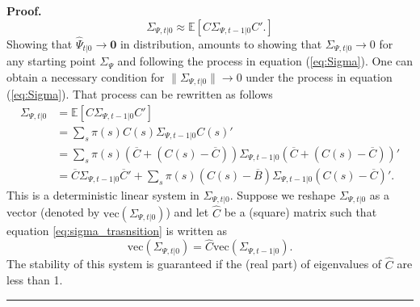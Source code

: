 \documentclass[thmsb,11pt]{article}
\newenvironment{proof}[1][Proof]{\noindent \textbf{#1.} }{\  \rule{0.5em}{0.5em}}
\begin{document}
\begin{proof}
	\begin{equation}
		\Sigma_{\Psi,t|0} \approx \mathbb{E}[C \Sigma_{\Psi,t-1|0} C'.] \label{eq:Sigma}
	\end{equation}  Showing that $\hat{\Psi}_{t|0} \rightarrow \bm 0$ in distribution, amounts to showing that $\Sigma_{\Psi,t|0}\rightarrow 0$ for any starting point $\Sigma_{\Psi}$ and following the process in equation (\ref{eq:Sigma}).  One can obtain a necessary condition for $\|\Sigma_{\Psi,t|0}\|\rightarrow 0$ under the process in equation (\ref{eq:Sigma}).
	That process can be rewritten as follows
	\begin{align}
		\Sigma_{\Psi,t|0} &= \mathbb{E}[C \Sigma_{\Psi,t-1|0} C']\\
				    &=\sum_s \pi(s) C(s) \Sigma_{\Psi,t-1|0} C(s)'\\
				   &=\sum_s \pi(s) (\overline C+(C(s)-\overline C))\Sigma_{\Psi,t-1|0}(\overline C+(C(s)-\overline C))'\\
				  &=\overline C \Sigma_{\Psi,t-1|0}\overline C' +\sum_s\pi(s) (C(s)-\overline B)\Sigma_{\Psi,t-1|0}(C(s)-\overline C)'.\label{eq:sigma_trasnsition}
	\end{align}
% 	
 	This is a deterministic linear system in $\Sigma_{\Psi,t|0}$. Suppose we reshape $\Sigma_{\Psi,t|0}$  as a vector (denoted by $\text{vec}(\Sigma_{\Psi,t|0})$) and let $\hat{C}$ be a (square) matrix such that equation \ref{eq:sigma_trasnsition} is written as
% 	
 \[\text{vec}(\Sigma_{\Psi,t|0})=\hat{C}\text{vec}( \Sigma_{\Psi,t-1|0}).\]	
%
 The stability of this system is guaranteed if the (real part) of eigenvalues of $\hat{C}$ are less than 1.
 \end{proof}
\end{document}
